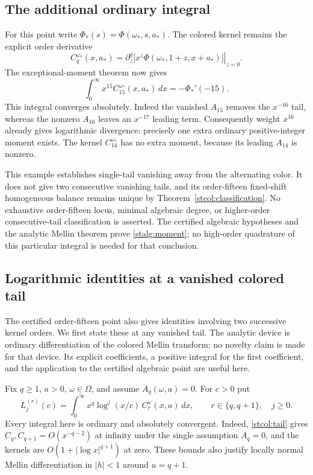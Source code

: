 \subsection{The additional ordinary integral}

For this point write $\Phi_*(s)=\Phi(\omega_*,s,a_*)$.
The colored kernel remains the explicit order derivative
\[
 C_q^{\omega_*}(x,a_*)=
 \left.\partial_z^q\bigl[x^z
          \Phi(\omega_*,1+z,x+a_*)\bigr]\right|_{z=0}.
\]
The exceptional-moment theorem now gives
\begin{equation}\label{stalg:moment}
 \boxed{\displaystyle
 \int_0^\infty x^{15}C_{15}^{\omega_*}(x,a_*)\,dx
       =-\Phi_*'(-15).}
\end{equation}
This integral converges absolutely.  Indeed the vanished $A_{15}$
removes the $x^{-16}$ tail, whereas the nonzero $A_{16}$ leaves an
$x^{-17}$ leading term.  Consequently weight $x^{16}$ already gives
logarithmic divergence: precisely one extra ordinary positive-integer
moment exists.  The kernel $C_{14}^{\omega_*}$ has no extra moment,
because its leading $A_{14}$ is nonzero.

This example establishes single-tail vanishing away from the alternating
color.  It does not give two consecutive vanishing tails, and its
order-fifteen fixed-shift homogeneous balance remains unique by
Theorem~\ref{stcol:classification}.  No exhaustive order-fifteen locus,
minimal algebraic degree, or higher-order consecutive-tail classification
is asserted.  The certified algebraic hypotheses and the analytic
Mellin theorem prove \eqref{stalg:moment}; no high-order quadrature of
this particular integral is needed for that conclusion.

\subsection{Logarithmic identities at a vanished colored tail}
\label{st15:logarithmic}

The certified order-fifteen point also gives identities involving two
successive kernel orders.  We first state these at any vanished tail.
The analytic device is ordinary differentiation of the colored Mellin
transform; no novelty claim is made for that device.  Its explicit
coefficients, a positive integral for the first coefficient, and the
application to the certified algebraic point are useful here.

Fix $q\ge1$, $a>0$, $\omega\in\Omega$, and assume
$A_q(\omega,a)=0$.  For $c>0$ put
\[
 L_j^{(r)}(c)=\int_0^\infty
     x^q\log^j(x/c)\,C_r^\omega(x,a)\,dx,
 \qquad r\in\{q,q+1\},\quad j\ge0.
\]
Every integral here is ordinary and absolutely convergent.
Indeed, \eqref{stcol:tail} gives $C_q,C_{q+1}=O(x^{-q-2})$
at infinity under the single assumption $A_q=0$, and the kernels
are $O(1+|\log x|^{q+1})$ at zero.  These bounds also justify
locally normal Mellin differentiation in $|h|<1$ around $u=q+1$.

